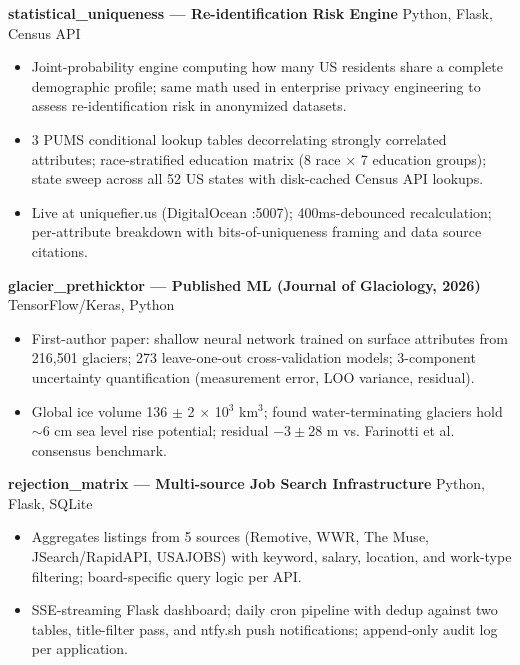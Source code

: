\documentclass[11pt,a4paper]{article}
\begin{document}
\vspace{0.2cm}
\noindent
\textbf{statistical\_uniqueness --- Re-identification Risk Engine} \hfill Python, Flask, Census API
\begin{itemize}
    \item Joint-probability engine computing how many US residents share a complete demographic profile; same math used in enterprise privacy engineering to assess re-identification risk in anonymized datasets.
    \item 3 PUMS conditional lookup tables decorrelating strongly correlated attributes; race-stratified education matrix (8 race $\times$ 7 education groups); state sweep across all 52 US states with disk-cached Census API lookups.
    \item Live at uniquefier.us (DigitalOcean :5007); 400ms-debounced recalculation; per-attribute breakdown with bits-of-uniqueness framing and data source citations.
\end{itemize}

\vspace{0.2cm}
\noindent
\textbf{glacier\_prethicktor --- Published ML (Journal of Glaciology, 2026)} \hfill TensorFlow/Keras, Python
\begin{itemize}
    \item First-author paper: shallow neural network trained on surface attributes from 216,501 glaciers; 273 leave-one-out cross-validation models; 3-component uncertainty quantification (measurement error, LOO variance, residual).
    \item Global ice volume 136 $\pm$ 2 $\times$ 10$^3$ km$^3$; found water-terminating glaciers hold $\sim$6 cm sea level rise potential; residual $-3 \pm 28$ m vs. Farinotti et al. consensus benchmark.
\end{itemize}

\vspace{0.2cm}
\noindent
\textbf{rejection\_matrix --- Multi-source Job Search Infrastructure} \hfill Python, Flask, SQLite
\begin{itemize}
    \item Aggregates listings from 5 sources (Remotive, WWR, The Muse, JSearch/RapidAPI, USAJOBS) with keyword, salary, location, and work-type filtering; board-specific query logic per API.
    \item SSE-streaming Flask dashboard; daily cron pipeline with dedup against two tables, title-filter pass, and ntfy.sh push notifications; append-only audit log per application.
\end{itemize}
\end{document}
